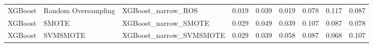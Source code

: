 \begin{tabular}{lllllllll}
                     XGBoost & Random Oversampling &                           XGBoost\_narrow\_ROS & 0.019 &                     0.039 &                 0.019 &                  0.078 &                                   0.117 &    0.087 \\
                     XGBoost &               SMOTE &                         XGBoost\_narrow\_SMOTE & 0.029 &                     0.049 &                 0.039 &                  0.107 &                                   0.087 &    0.078 \\
                     XGBoost &            SVMSMOTE &                      XGBoost\_narrow\_SVMSMOTE & 0.029 &                     0.039 &                 0.058 &                  0.087 &                                   0.068 &    0.107 \\
\bottomrule
\end{tabular}
